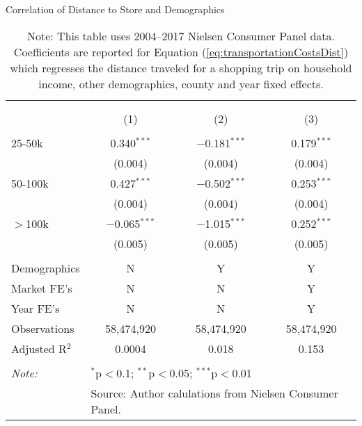 \begin{table}[!htbp] \centering
  \caption{Correlation of Distance to Store and Demographics}
  \label{tab:transportationCostsDist}
\begin{tabular}{@{\extracolsep{5pt}}lccc}
\\[-1.8ex]\hline
\hline \\[-1.8ex]
\\[-1.8ex] & (1) & (2) & (3)\\
\hline \\[-1.8ex]
 25-50k & 0.340$^{***}$ & $-$0.181$^{***}$ & 0.179$^{***}$ \\
  & (0.004) & (0.004) & (0.004) \\
  50-100k & 0.427$^{***}$ & $-$0.502$^{***}$ & 0.253$^{***}$ \\
  & (0.004) & (0.004) & (0.004) \\
  $>$100k & $-$0.065$^{***}$ & $-$1.015$^{***}$ & 0.252$^{***}$ \\
  & (0.005) & (0.005) & (0.005) \\
 \hline \\[-1.8ex]
Demographics & N & Y & Y \\
Market FE's & N & N & Y \\
Year FE's & N & N & Y \\
Observations & 58,474,920 & 58,474,920 & 58,474,920 \\
Adjusted R$^{2}$ & 0.0004 & 0.018 & 0.153 \\
\hline
\hline \\[-1.8ex]
\textit{Note:}  & \multicolumn{3}{l}{$^{*}$p$<$0.1; $^{**}$p$<$0.05; $^{***}$p$<$0.01} \\
 & \multicolumn{3}{l}{Source: Author calulations from Nielsen Consumer Panel.} \\
\end{tabular}
\caption*{Note: This table uses 2004--2017 Nielsen Consumer Panel data. Coefficients are reported for Equation (\ref{eq:transportationCostsDist}) which regresses the distance traveled for a shopping trip on household income, other demographics, county and year fixed effects.}
\end{table}
